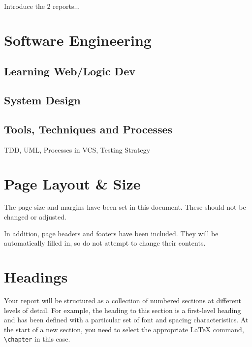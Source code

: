 \documentclass[]{final_report}
\begin{document}
Introduce the 2 reports...





\chapter{Software Engineering}

\section{Learning Web/Logic Dev}

\section{System Design}



\section{Tools, Techniques and Processes}

TDD, UML, Processes in VCS, Testing Strategy

\chapter{Page Layout \& Size}

The page size and margins have been set in this document. These should not be changed or adjusted. 

In addition, page headers and footers have been included. They will be automatically filled in, so do not attempt to change their contents.

\chapter{Headings}

Your report will be structured as a collection of numbered sections at different levels of detail. For example, the heading to this section is a first-level heading and has been defined with a particular set of font and spacing characteristics. At the start of a new section, you need to select the appropriate \LaTeX{} command, \verb|\chapter| in this case.
\end{document}

